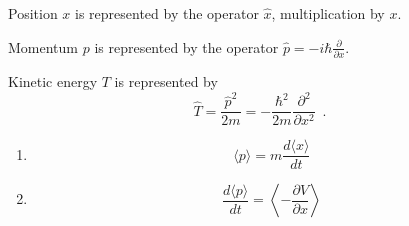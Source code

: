 Position $x$ is represented by the operator $\hat{x}$, multiplication by $x$.

Momentum $p$ is represented by the operator $\hat{p} = - i \hbar \frac{\partial}{\partial x}$.

Kinetic energy $T$ is represented by
\[ \hat{T} = \frac{\hat{p}^2}{2m} = - \frac{\hbar^2}{2m} \frac{\partial^2}{\partial x^2} \enspace . \]

\begin{prop}
\begin{enumerate}
\item \[ \langle p \rangle = m \frac{d \langle x \rangle}{dt} \]
\item \[ \frac{d \langle p \rangle}{dt} = \left\langle - \frac{\partial V}{\partial x} \right\rangle \]
\end{enumerate}
\end{prop}

